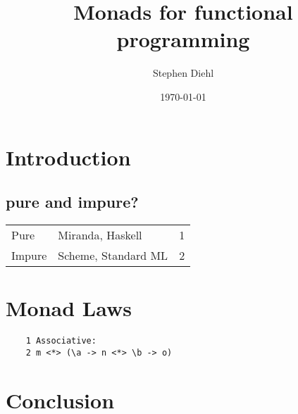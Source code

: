 \documentclass [12pt]{article}
\title{Monads for functional programming}
\author{Stephen Diehl}
\date{\today}
\begin{document}
\maketitle
\tableofcontents 
\section{Introduction}
\subsection{pure and impure?}

\begin{tabular}{lll}
    \hline
    Pure & Miranda, Haskell & 1 \\
    Impure & Scheme, Standard ML& 2 \\
    \hline
\end{tabular}
\section{Monad Laws}
\begin{verbatim}
    1 Associative: 
    2 m <*> (\a -> n <*> \b -> o)
\end{verbatim}
\section{Conclusion}
\end{document}
